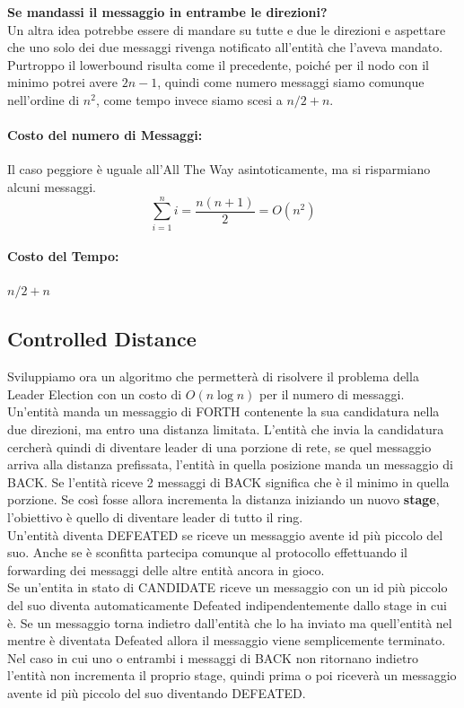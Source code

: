\textbf{Se mandassi il messaggio in entrambe le direzioni?}\\
Un altra idea potrebbe essere di mandare su tutte e due le direzioni e aspettare
che uno solo dei due messaggi rivenga notificato all'entità che l'aveva
mandato.\\
Purtroppo il lowerbound risulta come il precedente, poiché per il nodo con il
minimo potrei avere $2n - 1$, quindi come numero messaggi siamo comunque
nell'ordine di $n^2$, come tempo invece siamo scesi a $n/2 + n$.

\paragraph{Costo del numero di Messaggi:} Il caso peggiore è uguale all'All The Way
asintoticamente, ma si risparmiano alcuni messaggi.
$$\sum_{i=1}^{n} i = \frac{n(n+1)}{2} = O(n^2)$$

\paragraph{Costo del Tempo:} $n/2 + n$\\


\subsection{Controlled Distance}
Sviluppiamo ora un algoritmo che permetterà di risolvere il problema della
Leader Election con un costo di $O(n \log n)$ per il numero di messaggi.
Un'entità manda un messaggio di FORTH contenente la sua candidatura nella due
direzioni, ma entro una distanza limitata. L'entità che invia la candidatura
cercherà quindi di diventare leader di una porzione di rete, se quel messaggio
arriva alla distanza prefissata, l'entità in quella posizione manda un messaggio
di BACK. Se l'entità riceve 2 messaggi di BACK significa che è il minimo in
quella porzione. Se così fosse allora incrementa la distanza iniziando un nuovo
\textbf{stage}, l'obiettivo è quello di diventare leader di tutto il ring.\\
Un'entità diventa DEFEATED se riceve un messaggio avente id più piccolo del suo.
Anche se è sconfitta partecipa comunque al protocollo effettuando il forwarding
dei messaggi delle altre entità ancora in gioco.\\
Se un'entita in stato di CANDIDATE riceve un messaggio con un id più piccolo del
suo diventa automaticamente Defeated indipendentemente dallo stage in cui è. Se
un messaggio torna indietro dall'entità che lo ha inviato ma quell'entità nel
mentre è diventata Defeated allora il messaggio viene semplicemente terminato.\\
Nel caso in cui uno o entrambi i messaggi di BACK non ritornano indietro
l'entità non incrementa il proprio stage, quindi prima o poi riceverà un
messaggio avente id più piccolo del suo diventando DEFEATED.

